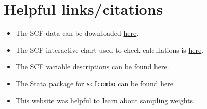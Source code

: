 \documentclass[12pt]{article}
\begin{document}
\section{Helpful links/citations}
\begin{itemize}
	\item The SCF data can be downloaded \href{https://www.federalreserve.gov/econres/scfindex.htm}{here}. 
	\item The SCF interactive chart used to check calculations is \href{https://www.federalreserve.gov/econres/scf/dataviz/scf/chart/#series:Primary_Residence;demographic:all;population:1;units:mean;range:1989,2019}{here}. 
	\item The SCF variable descriptions can be found \href{https://sda.berkeley.edu/sdaweb/docs/scfcomb2019/DOC/hcbkfx0.htm}{here}. 
	\item The Stata package for \texttt{scfcombo} can be found \href{https://ideas.repec.org/c/boc/bocode/s458017.html}{here}
	\item This \href{https://stats.oarc.ucla.edu/stata/seminars/applied-svy-stata13/#:~:text=The\%20probability\%20weight\%2C\%20called\%20a,be\%2010\%2F3\%20\%3D\%203.33.}{website} was helpful to learn about sampling weights. 
\end{itemize}
\end{document}
